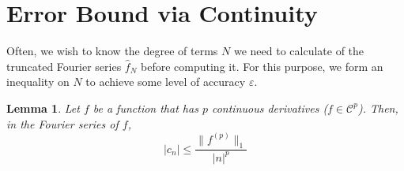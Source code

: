\documentclass{article}
\newtheorem{lemma}[theorem]{Lemma}
\begin{document}
\section{Error Bound via Continuity}

Often, we wish to know the degree of terms $N$ we need to calculate of the truncated Fourier series $\hat{f}_N$ before computing it. For this purpose, we form an inequality on $N$ to achieve some level of accuracy $\varepsilon$.

\begin{lemma}
    Let $f$ be a function that has $p$ continuous derivatives ($f \in \mathcal{C}^p$). Then, in the Fourier series of $f$,
    \begin{equation}
        |c_n| \leq \frac{\lVert f^{(p)} \rVert_1}{|n|^p}
    \end{equation}
\end{lemma}
\end{document}

